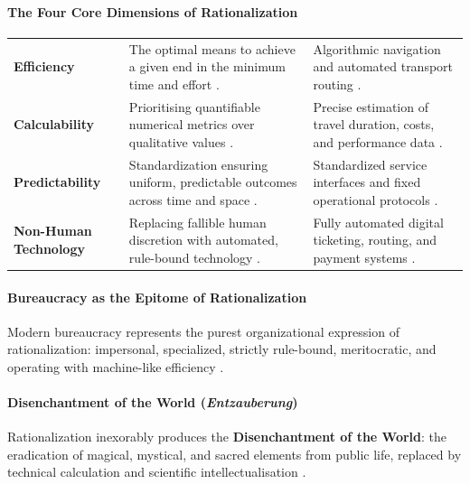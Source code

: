 \paragraph{The Four Core Dimensions of Rationalization}

\begin{table}[htbp]
\centering
\begin{tabularx}{\textwidth}{p{3.5cm} Y Y}
\hline
{}
 &  &  \\
\hline
\textbf{Efficiency} & The optimal means to achieve a given end in the minimum time and effort . & Algorithmic navigation and automated transport routing . \\
\textbf{Calculability} & Prioritising quantifiable numerical metrics over qualitative values . & Precise estimation of travel duration, costs, and performance data . \\
\textbf{Predictability} & Standardization ensuring uniform, predictable outcomes across time and space . & Standardized service interfaces and fixed operational protocols . \\
\textbf{Non-Human Technology} & Replacing fallible human discretion with automated, rule-bound technology . & Fully automated digital ticketing, routing, and payment systems . \\
\hline
\end{tabularx}
\end{table}

\paragraph{Bureaucracy as the Epitome of Rationalization}
Modern bureaucracy represents the purest organizational expression of rationalization: impersonal, specialized, strictly rule-bound, meritocratic, and operating with machine-like efficiency .

\paragraph{Disenchantment of the World (\textit{Entzauberung})}
\begin{KeyConcept}
Rationalization inexorably produces the \textbf{Disenchantment of the World}: the eradication of magical, mystical, and sacred elements from public life, replaced by technical calculation and scientific intellectualisation .
\end{KeyConcept}

